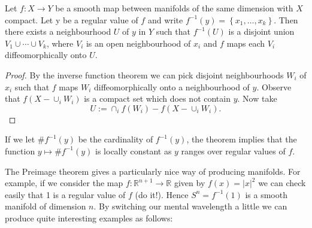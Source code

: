 \documentclass[a4paper]{scrartcl}
\begin{document}
\begin{theorem}\label{thm:stackofrecords}
    Let $f: X \rightarrow Y$ be a smooth map between manifolds of the same dimension with $X$ compact. Let y be a regular value of $f$ and write $f^{-1}(y)=\left\{x_{1}, \ldots, x_{k}\right\}$. Then there exists a neighbourhood $U$ of $y$ in $Y$ such that $f^{-1}(U)$ is a disjoint union $V_{1} \cup \cdots \cup V_{k}$, where $V_{i}$ is an open neighbourhood of $x_{i}$ and $f$ maps each $V_{i}$ diffeomorphically onto $U$.
\end{theorem}
\begin{proof}
    By the inverse function theorem we can pick disjoint neighbourhoods $W_{i}$ of $x_{i}$ such that $f$ maps $W_{i}$ diffeomorphically onto a neighbourhood of $y$. Observe that $f\left(X-\cup_{i} W_{i}\right)$ is a compact set which does not contain $y$. Now take
$$
U:=\cap_{i} f\left(W_{i}\right)-f\left(X-\cup_{i} W_{i}\right).
$$
\end{proof}


If we let $\# f^{-1}(y)$ be the cardinality of $f^{-1}(y)$, the theorem implies that the function $y \mapsto \# f^{-1}(y)$ is locally constant as $y$ ranges over regular values of $f$.

The Preimage theorem gives a particularly nice way of producing manifolds. For example, if we consider the map $f: \mathbb{R}^{n+1} \rightarrow \mathbb{R}$ given by $f(x)=|x|^{2}$ we can check easily that 1 is a regular value of $f$ (do it!). Hence $S^{n}=f^{-1}(1)$ is a smooth manifold of dimension $n$. By switching our mental wavelength a little we can produce quite interesting examples as follows:
\end{document}
